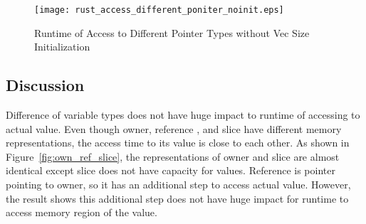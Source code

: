 \begin{figure}[htb]
    \texttt{[image: rust\_access\_different\_poniter\_noinit.eps]}
    \caption{Runtime of Access to Different Pointer Types without Vec Size Initialization}
    \label{fig:rustaccessnoinit}
\end{figure}



\subsection{Discussion}
\label{sec:history}
Difference of variable types does not have huge impact to runtime of accessing to actual value.
Even though owner, reference , and slice have different memory representations, the access time to its value is 
close to each other. As shown in Figure~\ref{fig:own_ref_slice}, the representations of owner and slice are almost identical except slice does not have capacity for values.
Reference is pointer pointing to owner, so it has an additional step to access actual value. 
However, the result shows this additional step does not have huge impact for runtime to access memory region of the value.


